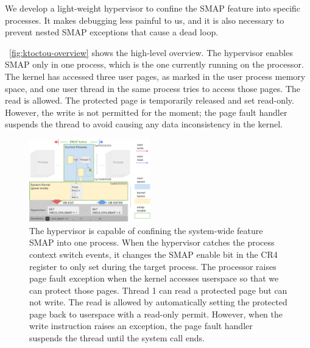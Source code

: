 We develop a light-weight hypervisor to confine the SMAP feature into specific processes. It makes debugging less painful to us, and it is also necessary to prevent nested SMAP exceptions that cause a dead loop.

~\autoref{fig:ktoctou-overview} shows the high-level overview. The hypervisor enables SMAP only in one process, which is the one currently running on the processor. The kernel has accessed three user pages, as marked in the user process memory space, and one user thread in the same process tries to access those pages. The read is allowed. The protected page is temporarily released and set read-only. However, the write is not permitted for the moment; the page fault handler suspends the thread to avoid causing any data inconsistency in the kernel.

\begin{figure}[th]
  \includegraphics[width=0.47\textwidth]{figures/ktoctou-overview2}
  \centering
  \caption{The hypervisor is capable of confining the system-wide feature SMAP into one process. When the hypervisor catches the process context switch events, it changes the SMAP enable bit in the CR4 register to only set during the target process. The processor raises page fault exception when the kernel accesses userspace so that we can protect those pages. Thread 1 can read a protected page but can not write. The read is allowed by automatically setting the protected page back to userspace with a read-only permit. However, when the write instruction raises an exception, the page fault handler suspends the thread until the system call ends.}
  \label{fig:ktoctou-overview}
\end{figure}
